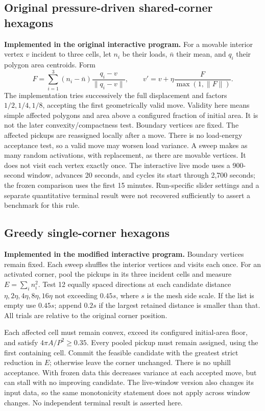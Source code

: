 \documentclass[11pt]{article}
\begin{document}
\subsection{Original pressure-driven shared-corner hexagons}
\textbf{Implemented in the original interactive program.}
For a movable interior vertex $v$ incident to three cells, let $n_i$ be their
loads, $\bar n$ their mean, and $q_i$ their polygon area centroids. Form
\[
 F=\sum_{i=1}^3(n_i-\bar n)\frac{q_i-v}{\|q_i-v\|},\qquad
 v'=v+\eta\frac{F}{\max(1,\|F\|)}.
\]
The implementation tries successively the full displacement and factors
$1/2,1/4,1/8$, accepting the first geometrically valid move. Validity here means
simple affected polygons and area above a configured fraction of initial area.
It is not the later convexity/compactness test. Boundary vertices are fixed.
The affected pickups are reassigned locally after a move. There is no
load-energy acceptance test, so a valid move may worsen load variance.
A sweep makes as many random activations, with replacement, as there are
movable vertices. It does not visit each vertex exactly once.
The interactive live mode uses a 900-second window, advances 20 seconds, and
cycles its start through 2,700 seconds; the frozen comparison uses the first
15 minutes. Run-specific slider settings and a separate quantitative terminal
result were not recovered sufficiently to assert a benchmark for this rule.

\subsection{Greedy single-corner hexagons}
\textbf{Implemented in the modified interactive program.}
Boundary vertices remain fixed. Each sweep shuffles the interior vertices and
visits each once. For an activated corner, pool the pickups in its three incident
cells and measure $E=\sum_i n_i^2$. Test 12 equally spaced directions at each
candidate distance $\eta,2\eta,4\eta,8\eta,16\eta$ not exceeding $0.45s$, where
$s$ is the mesh side scale. If the list is empty use $0.45s$; append $0.2s$ if
the largest retained distance is smaller than that. All trials are relative to
the original corner position.

Each affected cell must remain convex, exceed its configured initial-area floor,
and satisfy $4\pi A/P^2\geq0.35$. Every pooled pickup must remain assigned,
using the first containing cell. Commit the feasible candidate with the greatest
strict reduction in $E$; otherwise leave the corner unchanged. There is no
uphill acceptance. With frozen data this decreases variance at each accepted
move, but can stall with no improving candidate. The live-window version also
changes its input data, so the same monotonicity statement does not apply
across window changes. No independent terminal result is asserted here.
\end{document}
